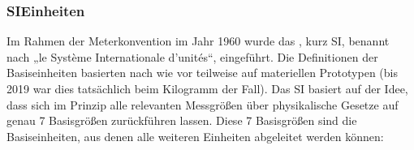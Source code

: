 \documentclass[letterpaper,10pt,english]{jupyterBook}
\begin{document}
\subsubsection{SI\sphinxhyphen{}Einheiten}
\label{\detokenize{content/1_Messen_Einheit:si-einheiten}}
\sphinxAtStartPar
Im Rahmen der Meterkonvention im Jahr 1960 wurde das , kurz SI, benannt nach „le Système Internationale d’unités“, eingeführt. Die Definitionen der Basiseinheiten basierten nach wie vor teilweise auf materiellen Prototypen (bis 2019 war dies tatsächlich beim Kilogramm der Fall). Das SI basiert auf der Idee, dass sich im Prinzip alle relevanten Messgrößen über physikalische Gesetze auf genau 7 Basisgrößen zurückführen lassen. Diese 7 Basisgrößen sind die Basiseinheiten, aus denen alle weiteren Einheiten abgeleitet werden können:
\end{document}
